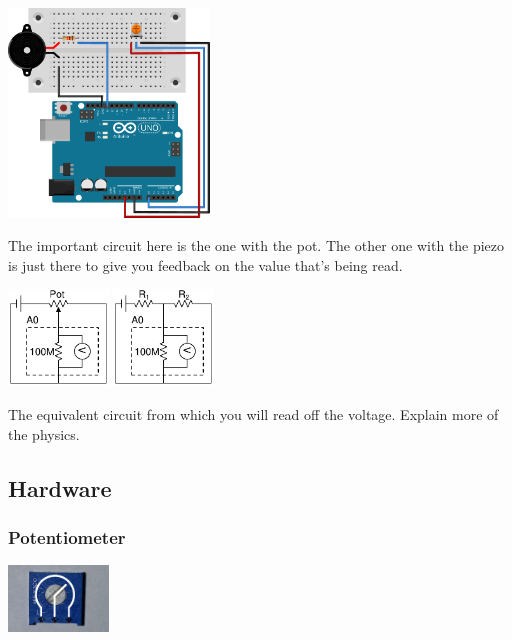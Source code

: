 \begin{center}
    \includegraphics[width=0.4\textwidth]{./Graphics/piezo_circuit}
\end{center}

The important circuit here is the one with the pot.
The other one with the piezo is just there to give you feedback
on the value that's being read.

\begin{center}
    \includegraphics[width=0.2\textwidth]{./Graphics/PotCircuit.pdf}
    \includegraphics[width=0.2\textwidth]{./Graphics/PotEquivCircuit.pdf}
\end{center}

The equivalent circuit from which you will read off the voltage.
Explain more of the physics.

\subsection{Hardware}
\subsubsection{Potentiometer}
\begin{center}
    \includegraphics[width=0.2\textwidth]{./Graphics/pot_internal}
\end{center}

